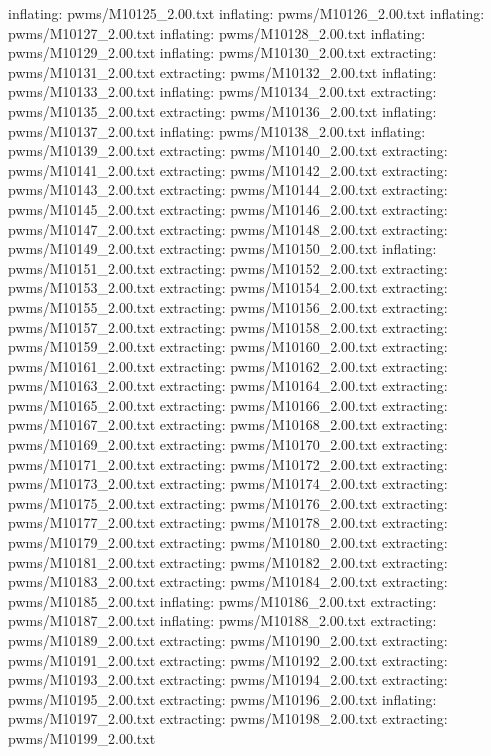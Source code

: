 \documentclass[letterpaper,10pt,english]{sphinxmanual}
\begin{document}
{\begin{sphinxVerbatim}[commandchars=\\\{\}]
  inflating: pwms/M10125\_2.00.txt
  inflating: pwms/M10126\_2.00.txt
  inflating: pwms/M10127\_2.00.txt
  inflating: pwms/M10128\_2.00.txt
  inflating: pwms/M10129\_2.00.txt
  inflating: pwms/M10130\_2.00.txt
 extracting: pwms/M10131\_2.00.txt
 extracting: pwms/M10132\_2.00.txt
  inflating: pwms/M10133\_2.00.txt
  inflating: pwms/M10134\_2.00.txt
 extracting: pwms/M10135\_2.00.txt
 extracting: pwms/M10136\_2.00.txt
  inflating: pwms/M10137\_2.00.txt
  inflating: pwms/M10138\_2.00.txt
  inflating: pwms/M10139\_2.00.txt
 extracting: pwms/M10140\_2.00.txt
 extracting: pwms/M10141\_2.00.txt
 extracting: pwms/M10142\_2.00.txt
 extracting: pwms/M10143\_2.00.txt
 extracting: pwms/M10144\_2.00.txt
 extracting: pwms/M10145\_2.00.txt
 extracting: pwms/M10146\_2.00.txt
 extracting: pwms/M10147\_2.00.txt
 extracting: pwms/M10148\_2.00.txt
 extracting: pwms/M10149\_2.00.txt
 extracting: pwms/M10150\_2.00.txt
  inflating: pwms/M10151\_2.00.txt
 extracting: pwms/M10152\_2.00.txt
 extracting: pwms/M10153\_2.00.txt
 extracting: pwms/M10154\_2.00.txt
 extracting: pwms/M10155\_2.00.txt
 extracting: pwms/M10156\_2.00.txt
 extracting: pwms/M10157\_2.00.txt
 extracting: pwms/M10158\_2.00.txt
 extracting: pwms/M10159\_2.00.txt
 extracting: pwms/M10160\_2.00.txt
 extracting: pwms/M10161\_2.00.txt
 extracting: pwms/M10162\_2.00.txt
 extracting: pwms/M10163\_2.00.txt
 extracting: pwms/M10164\_2.00.txt
 extracting: pwms/M10165\_2.00.txt
 extracting: pwms/M10166\_2.00.txt
 extracting: pwms/M10167\_2.00.txt
 extracting: pwms/M10168\_2.00.txt
 extracting: pwms/M10169\_2.00.txt
 extracting: pwms/M10170\_2.00.txt
 extracting: pwms/M10171\_2.00.txt
 extracting: pwms/M10172\_2.00.txt
 extracting: pwms/M10173\_2.00.txt
 extracting: pwms/M10174\_2.00.txt
 extracting: pwms/M10175\_2.00.txt
 extracting: pwms/M10176\_2.00.txt
 extracting: pwms/M10177\_2.00.txt
 extracting: pwms/M10178\_2.00.txt
 extracting: pwms/M10179\_2.00.txt
 extracting: pwms/M10180\_2.00.txt
 extracting: pwms/M10181\_2.00.txt
 extracting: pwms/M10182\_2.00.txt
 extracting: pwms/M10183\_2.00.txt
 extracting: pwms/M10184\_2.00.txt
 extracting: pwms/M10185\_2.00.txt
  inflating: pwms/M10186\_2.00.txt
 extracting: pwms/M10187\_2.00.txt
  inflating: pwms/M10188\_2.00.txt
 extracting: pwms/M10189\_2.00.txt
 extracting: pwms/M10190\_2.00.txt
 extracting: pwms/M10191\_2.00.txt
 extracting: pwms/M10192\_2.00.txt
 extracting: pwms/M10193\_2.00.txt
 extracting: pwms/M10194\_2.00.txt
 extracting: pwms/M10195\_2.00.txt
 extracting: pwms/M10196\_2.00.txt
  inflating: pwms/M10197\_2.00.txt
 extracting: pwms/M10198\_2.00.txt
 extracting: pwms/M10199\_2.00.txt

\end{sphinxVerbatim}}
\end{document}
